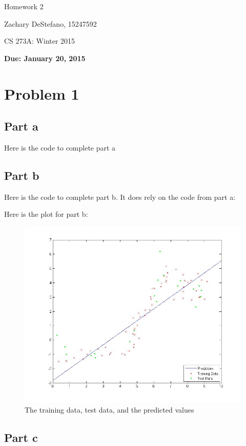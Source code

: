 \documentclass[twoside,11pt]{article}
\theoremstyle{definition}
\begin{document}
\centerline{\Large Homework 2}
\centerline{Zachary DeStefano, 15247592}
\centerline{CS 273A: Winter 2015}
\centerline{\bf Due: January 20, 2015}

\section*{Problem 1}

\subsection*{Part a}

Here is the code to complete part a


\subsection*{Part b}

Here is the code to complete part b. It does rely on the code from part a:


\newpage

Here is the plot for part b:
\begin{figure}[h]
\centering
\includegraphics[width=5 in]{prob1bPlot.jpg}
\caption{The training data, test data, and the predicted values}
\end{figure}

\newpage

\subsection*{Part c}
\end{document}
